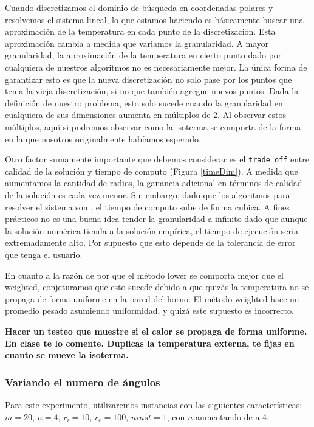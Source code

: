 Cuando discretizamos el dominio de búsqueda en coordenadas polares y resolvemos el sistema lineal, lo que estamos haciendo es básicamente buscar una aproximación de la temperatura en cada punto de la discretización. Esta aproximación cambia a medida que variamos la granularidad. A mayor granularidad, la aproximación de la temperatura en cierto punto dado por cualquiera de nuestros algoritmos no es necesariamente mejor. La única forma de garantizar esto es que la nueva discretización no solo pase por los puntos que tenia la vieja discretización, si no que también agregue nuevos puntos. Dada la definición de nuestro problema, esto solo sucede cuando la granularidad en cualquiera de sus dimensiones aumenta en múltiplos de 2. Al observar estos múltiplos, aquí si podremos observar como la isoterma se comporta de la forma en la que nosotros originalmente habíamos esperado.

Otro factor sumamente importante que debemos considerar es el \texttt{trade off} entre calidad de la solución y tiempo de computo (Figura \ref{timeDim}). A medida que aumentamos la cantidad de radios, la ganancia adicional en términos de calidad de la solución es cada vez menor. Sin embargo, dado que los algoritmos para resolver el sistema son , el tiempo de computo sube de forma cubica. A fines prácticos no es una buena idea tender la granularidad a infinito dado que aunque la solución numérica tienda a la solución empírica, el tiempo de ejecución seria extremadamente alto. Por supuesto que esto depende de la tolerancia de error que tenga el usuario.

En cuanto a la razón de por que el método lower se comporta mejor que el weighted, conjeturamos que esto sucede debido a que quizás la temperatura no se propaga de forma uniforme en la pared del horno. El método weighted hace un promedio pesado asumiendo uniformidad, y quizá este supuesto es incorrecto.

\textbf{Hacer un testeo que muestre si el calor se propaga de forma uniforme. En clase te lo comente. Duplicas la temperatura externa, te fijas en cuanto se mueve la isoterma.}

\pagebreak

\subsubsection*{Variando el numero de ángulos}

Para este experimento, utilizaremos instancias con las siguientes características: $m = 20$, $n = 4$, $r_i = 10$, $r_e = 100$, $ninst = 1$, con $n$ aumentando de a 4.

